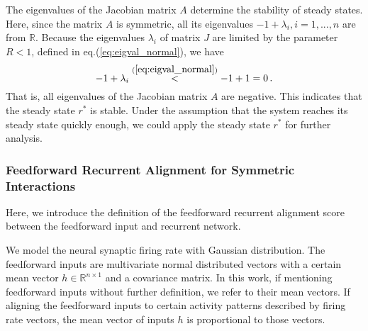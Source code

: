 \documentclass[11pt]{article}
\begin{document}
	The eigenvalues of the Jacobian matrix $A$ determine the stability of steady states. Here, since the matrix $A$ is symmetric, all its eigenvalues $-1 + \lambda_i, i = 1, ..., n$ are from $\mathbb{R}$. Because the eigenvalues $\lambda_i$ of matrix $J$ are limited by the parameter $R<1$, defined in eq.(\ref{eq:eigval_normal}), we have 
		\begin{equation} \label{eq:sym_stable_fix_point}
			-1 + \lambda_i \overset{(\ref{eq:eigval_normal})}{<} -1 + 1 = 0 \, .
		\end{equation}
	That is, all eigenvalues of the Jacobian matrix $A$ are negative. This indicates that the steady state $r^*$ is stable. Under the assumption that the system reaches its steady state quickly enough, we could apply the steady state $r^*$ for further analysis. 
	
	\subsubsection{Feedforward Recurrent Alignment for Symmetric Interactions} \label{sec:ffrec_definition}
	Here, we introduce the definition of the feedforward recurrent alignment score between the feedforward input and recurrent network. 
	
	We model the neural synaptic firing rate with Gaussian distribution. The feedforward inputs are multivariate normal distributed vectors with a certain mean vector $h \in \mathbb{R}^{n \times 1}$ and a covariance matrix. 
	In this work, if mentioning feedforward inputs without further definition, we refer to their mean vectors. If aligning the feedforward inputs to certain activity patterns described by firing rate vectors, the mean vector of inputs $h$ is proportional to those vectors.
	
\end{document}
